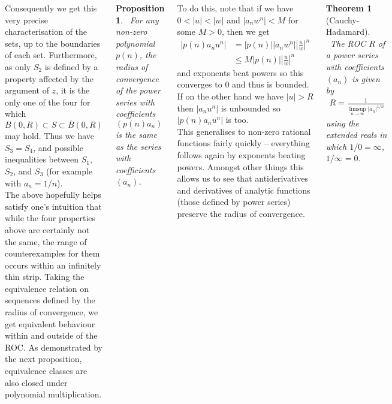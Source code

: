 \documentclass{tikzposter} %
\newtheorem{theorem}{Theorem}
\newtheorem{proposition}{Proposition}
\begin{document}
\begin{columns}
{  Consequently we get this very precise characterisation of the sets, up to the boundaries of each set. Furthermore, as only $S_{2}$ is defined by a property affected by the argument of $z$, it is the only one of the four for which $B(0,R) \subset S \subset \overline{B}(0,R)$ may hold. Thus we have $S_{3} = S_{4}$, and possible inequalities between $S_{1}$, $S_{2}$, and $S_{3}$ (for example with $a_{n} = 1/n$). \\

  The above hopefully helps satisfy one's intuition that while the four properties above are certainly not the same, the range of counterexamples for them occurs within an infinitely thin strip. Taking the equivalence relation on sequences defined by the radius of convergence, we get equivalent behaviour within and outside of the ROC. As demonstrated by the next proposition, equivalence classes are also closed under polynomial multiplication.\\

  \begin{proposition}
  \ For any non-zero polynomial $p(n)$, the radius of convergence of the power series with coefficients $(p(n)a_{n})$ is the same as the series with coefficients $(a_{n})$.
  \end{proposition}
  \hphantom{}

  To do this, note that if we have $0 < |u| < |w|$ and $|a_{n}w^{n}| < M$ for some $M > 0$, then we get
  \begin{align*}
    |p(n)a_{n}u^{n}| &= |p(n)||a_{n}w^{n}|\left|\frac{u}{w}\right|^{n} \\
                    &\le M |p(n)| \left|\frac{u}{w}\right|^{n}
  \end{align*}
  and exponents beat powers so this converges to $0$ and thus is bounded. If on the other hand we have $|u| > R$ then $|a_{n}u^{n}|$ is unbounded so $|p(n)a_{n}u^{n}|$ is too. \\

  This generalises to non-zero rational functions fairly quickly -- everything follows again by exponents beating powers. Amongst other things this allows us to see that antiderivatives and derivatives of analytic functions (those defined by power series) preserve the radius of convergence. \\

  \begin{theorem}[Cauchy-Hadamard]
    \ The ROC $R$ of a power series with coefficients $(a_{n})$ is given by
    \begin{align*}
      R = \frac{1}{\limsup_{n \to \infty} |a_{n}|^{1/n}}
    \end{align*}
    using the extended reals in which $1/0 = \infty$, $1/\infty = 0$.
  \end{theorem}
  \hphantom{}

}
\end{columns}
\end{document}
